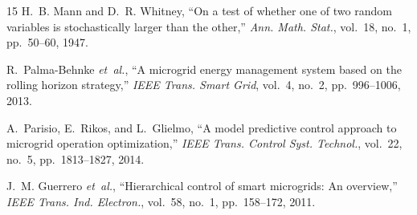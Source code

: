\documentclass[journal,10pt,twocolumn]{IEEEtran}
\begin{document}
\begin{thebibliography}{15}
H.~B. Mann and D.~R. Whitney, ``On a test of whether one of two random variables is stochastically larger than the other,'' \emph{Ann. Math. Stat.}, vol.~18, no.~1, pp.~50--60, 1947.

R.~Palma-Behnke \emph{et~al.}, ``A microgrid energy management system based on the rolling horizon strategy,'' \emph{IEEE Trans. Smart Grid}, vol.~4, no.~2, pp.~996--1006, 2013.

A.~Parisio, E.~Rikos, and L.~Glielmo, ``A model predictive control approach to microgrid operation optimization,'' \emph{IEEE Trans. Control Syst. Technol.}, vol.~22, no.~5, pp.~1813--1827, 2014.

J.~M. Guerrero \emph{et~al.}, ``Hierarchical control of smart microgrids: An overview,'' \emph{IEEE Trans. Ind. Electron.}, vol.~58, no.~1, pp.~158--172, 2011.
\end{thebibliography}
\end{document}
